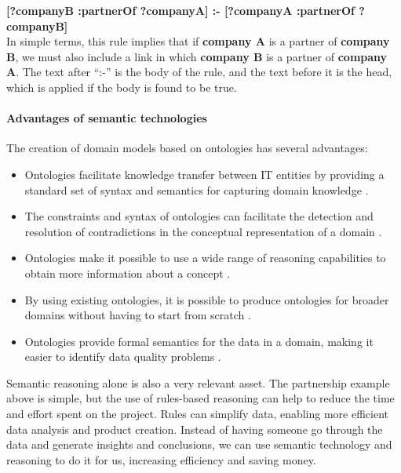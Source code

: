             \textbf{[?companyB :partnerOf ?companyA] :- [?companyA :partnerOf ?companyB]}\\
        
            In simple terms, this rule implies that if \textbf{company A} is a partner of \textbf{company B}, we must also include a link in which \textbf{company B} is a partner of \textbf{company A}. The text after “:-” is the body of the rule, and the text before it is the head, which is applied if the body is found to be true.


            \paragraph{Advantages of semantic technologies}
            The creation of domain models based on ontologies has several advantages: 
        
            \begin{itemize}
                \item Ontologies facilitate knowledge transfer between IT entities by providing a standard set of syntax and semantics for capturing domain knowledge \cite{spelten2023simulation}. 
                \item The constraints and syntax of ontologies can facilitate the detection and resolution of contradictions in the conceptual representation of a domain \cite{chen2012recommendation}. 
                \item Ontologies make it possible to use a wide range of reasoning capabilities to obtain more information about a concept \cite{chen2012recommendation}. 
                \item By using existing ontologies, it is possible to produce ontologies for broader domains without having to start from scratch \cite{bizer2008linked}. 
                \item Ontologies provide formal semantics for the data in a domain, making it easier to identify data quality problems \cite{spelten2023simulation, li2018ontology}.
            \end{itemize}
        
            Semantic reasoning alone is also a very relevant asset. The partnership example above is simple, but the use of rules-based reasoning can help to reduce the time and effort spent on the project. Rules can simplify data, enabling more efficient data analysis and product creation. Instead of having someone go through the data and generate insights and conclusions, we can use semantic technology and reasoning to do it for us, increasing efficiency and saving money.\\
        
